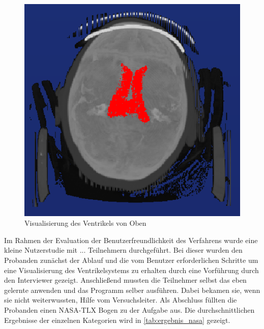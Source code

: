 \begin{figure}[h] 
\centering 
\includegraphics[width=\textwidth/2]{Logos/Oben.PNG}
\caption{Visualisierung des Ventrikels von Oben} 
\label{fig:ventrikel_oben} 
\end{figure}



Im Rahmen der Evaluation der Benutzerfreundlichkeit des Verfahrens wurde eine kleine Nutzerstudie mit ... Teilnehmern durchgeführt. Bei dieser wurden den Probanden zunächst der Ablauf und die vom Benutzer erforderlichen Schritte um eine Visualisierung des Ventrikelsystems zu erhalten durch eine Vorführung durch den Interviewer gezeigt. Anschließend mussten die Teilnehmer selbst das eben gelernte anwenden und das Programm selber ausführen. Dabei bekamen sie, wenn sie nicht weiterwussten, Hilfe vom Versuchsleiter. Als Abschluss füllten die Probanden einen NASA-TLX Bogen zu der Aufgabe aus. Die durchschnittlichen Ergebnisse der einzelnen Kategorien wird in \autoref{tab:ergebnis_nasa} gezeigt.


\begin{table}[h]
\centering
{}
\caption{Durchschnittlichen Ergebnisse des NASA-TLX Bogens}
\label{tab:ergebnis_nasa}
\end{table}



